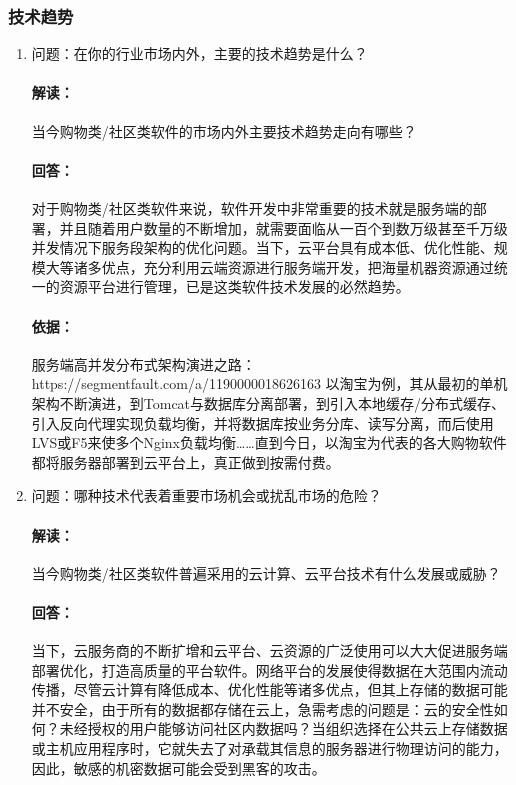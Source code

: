 \documentclass[a4paper]{ctexart}
\begin{document}
\subsubsection{技术趋势}
\begin{enumerate}[label=\alph*.]
  \item 问题：在你的行业市场内外，主要的技术趋势是什么？
  \paragraph{解读：}当今购物类/社区类软件的市场内外主要技术趋势走向有哪些？
  \paragraph{回答：}对于购物类/社区类软件来说，软件开发中非常重要的技术就是服务端的部署，并且随着用户数量的不断增加，就需要面临从一百个到数万级甚至千万级并发情况下服务段架构的优化问题。当下，云平台具有成本低、优化性能、规模大等诸多优点，充分利用云端资源进行服务端开发，把海量机器资源通过统一的资源平台进行管理，已是这类软件技术发展的必然趋势。
  \paragraph{依据：}服务端高并发分布式架构演进之路：https://segmentfault.com/a/1190000018626163
  以淘宝为例，其从最初的单机架构不断演进，到Tomcat与数据库分离部署，到引入本地缓存/分布式缓存、引入反向代理实现负载均衡，并将数据库按业务分库、读写分离，而后使用LVS或F5来使多个Nginx负载均衡……直到今日，以淘宝为代表的各大购物软件都将服务器部署到云平台上，真正做到按需付费。
  \item 问题：哪种技术代表着重要市场机会或扰乱市场的危险？
  \paragraph{解读：}当今购物类/社区类软件普遍采用的云计算、云平台技术有什么发展或威胁？
  \paragraph{回答：}当下，云服务商的不断扩增和云平台、云资源的广泛使用可以大大促进服务端部署优化，打造高质量的平台软件。网络平台的发展使得数据在大范围内流动传播，尽管云计算有降低成本、优化性能等诸多优点，但其上存储的数据可能并不安全，由于所有的数据都存储在云上，急需考虑的问题是：云的安全性如何？未经授权的用户能够访问社区内数据吗？当组织选择在公共云上存储数据或主机应用程序时，它就失去了对承载其信息的服务器进行物理访问的能力，因此，敏感的机密数据可能会受到黑客的攻击。

\end{enumerate}
\end{document}

